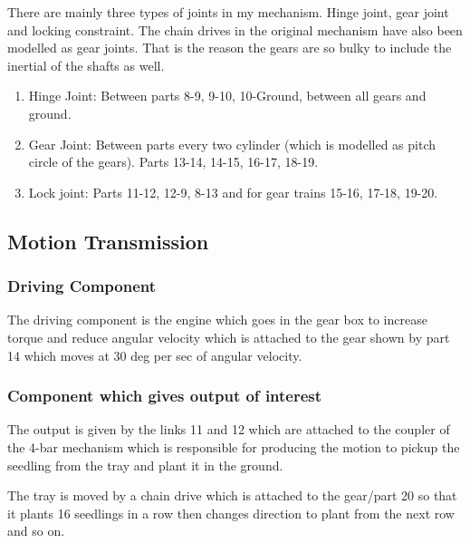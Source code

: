             There are mainly three types of joints in my mechanism. Hinge joint, gear joint and locking constraint. The chain drives in the original mechanism have also been modelled as gear joints. That is the reason the gears are so bulky to include the inertial of the shafts as well.

            \begin{enumerate}
                \item Hinge Joint: Between parts 8-9, 9-10, 10-Ground, between all gears and ground.
                \item Gear Joint: Between parts every two cylinder (which is modelled as pitch circle of the gears). Parts 13-14, 14-15, 16-17, 18-19.
                \item Lock joint: Parts 11-12, 12-9, 8-13 and for gear trains 15-16, 17-18, 19-20.
            \end{enumerate}

        \subsection{Motion Transmission}
            \subsubsection{Driving Component}
                The driving component is the engine which goes in the gear box to increase torque and reduce angular velocity which is attached to the gear shown by part 14 which moves at 30 deg per sec of angular velocity.
            
            \subsubsection{Component which gives output of interest}
                The output is given by the links 11 and 12 which are attached to the coupler of the 4-bar mechanism which is responsible for producing the motion to pickup the seedling from the tray and plant it in the ground. \par

                The tray is moved by a chain drive which is attached to the gear/part 20 so that it plants 16 seedlings in a row then changes direction to plant from the next row and so on.

        